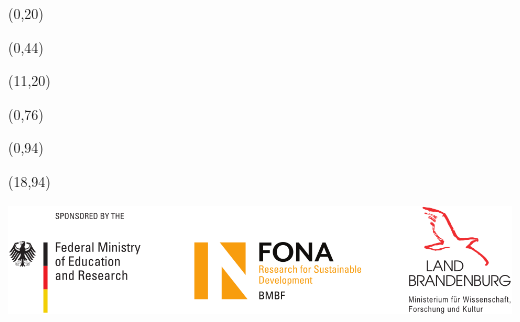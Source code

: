 \documentclass[20pt]{beamer}
\begin{document}
    \begin{frame}

        \begin{textblock}{10}(0,20)
            
        \end{textblock}

        \begin{textblock}{10}(0,44)
            
        \end{textblock}

        \begin{textblock}{19}(11,20)
            
        \end{textblock}

        \begin{textblock}{30}(0,76)
            
        \end{textblock}

        \begin{textblock}{17}(0,94)
            \begin{WhiteBox}
                \vspace{-1cm}
                \begin{block}{}
                    {\fontsize{17}{20}\selectfont}
                    
                \end{block}
            \end{WhiteBox}
        \end{textblock}

        \begin{textblock}{12}(18,94)
            \begin{WhiteBox}
                \vspace{-1cm}
                \begin{block}{}
                    \includegraphics[width=\textwidth]{img/Sponsor_logos}
                \end{block}
            \end{WhiteBox}
        \end{textblock}
    \end{frame}
\end{document}

